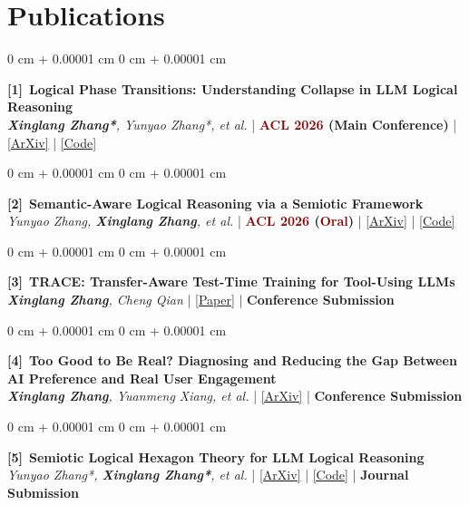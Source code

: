 \documentclass[10pt, letterpaper]{article}
\newcommand{\distinction}[1]{\textcolor{darkRed}{#1}}
\newcommand{\pubnum}[1]{{\footnotesize\textbf{[#1]}}}
\newenvironment{onecolentry}{
    \begin{adjustwidth}{
        0 cm + 0.00001 cm
    }{
        0 cm + 0.00001 cm
    }
}{
\end{adjustwidth}
} %
\begin{document}
\section{Publications}

\begin{onecolentry}
\pubnum{1}~\textbf{Logical Phase Transitions: Understanding Collapse in LLM Logical Reasoning} \\
\textit{\textbf{Xinglang Zhang*}, Yunyao Zhang*, et al.} | \textbf{\distinction{ACL 2026} (Main Conference)} |
\href{https://arxiv.org/abs/2601.02902}{\color{blue}[ArXiv]} |
\href{https://github.com/AI4SS/Logical-Phase-Transitions}{\color{blue}[Code]}
\end{onecolentry}
\vspace{0.05 cm}

\begin{onecolentry}
\pubnum{2}~\textbf{Semantic-Aware Logical Reasoning via a Semiotic Framework} \\
\textit{Yunyao Zhang, \textbf{Xinglang Zhang}, et al.} | \textbf{\distinction{ACL 2026} (\distinction{Oral})} |
\href{https://arxiv.org/abs/2509.24765}{\color{blue}[ArXiv]} |
\href{https://github.com/AI4SS/Logic-Agent}{\color{blue}[Code]}
\end{onecolentry}
\vspace{0.05 cm}

\begin{onecolentry}
\pubnum{3}~\textbf{TRACE: Transfer-Aware Test-Time Training for Tool-Using LLMs} \\
\textit{\textbf{Xinglang Zhang}, Cheng Qian} |
\href{https://drive.google.com/file/d/1_pGifgLGeNbYhm97wl-YnW84gn0-pHmm/view?usp=sharing}{\color{blue}[Paper]} |
\textbf{Conference Submission}
\end{onecolentry}
\vspace{0.05 cm}

\begin{onecolentry}
\pubnum{4}~{\small\textbf{Too Good to Be Real? Diagnosing and Reducing the Gap Between AI Preference and Real User Engagement}} \\
\textit{\textbf{Xinglang Zhang}, Yuanmeng Xiang, et al.} |
\href{https://arxiv.org/abs/2609.18282}{\color{blue}[ArXiv]} |
\textbf{Conference Submission}
\end{onecolentry}
\vspace{0.05 cm}

\begin{onecolentry}
\pubnum{5}~\textbf{Semiotic Logical Hexagon Theory for LLM Logical Reasoning} \\
\textit{Yunyao Zhang*, \textbf{Xinglang Zhang*}, et al.} |
\href{https://arxiv.org/abs/2607.21933}{\color{blue}[ArXiv]} |
\href{https://github.com/AI4SS/Logic-Agent}{\color{blue}[Code]} |
\textbf{Journal Submission}
\end{onecolentry}
\vspace{0.05 cm}
\end{document}
